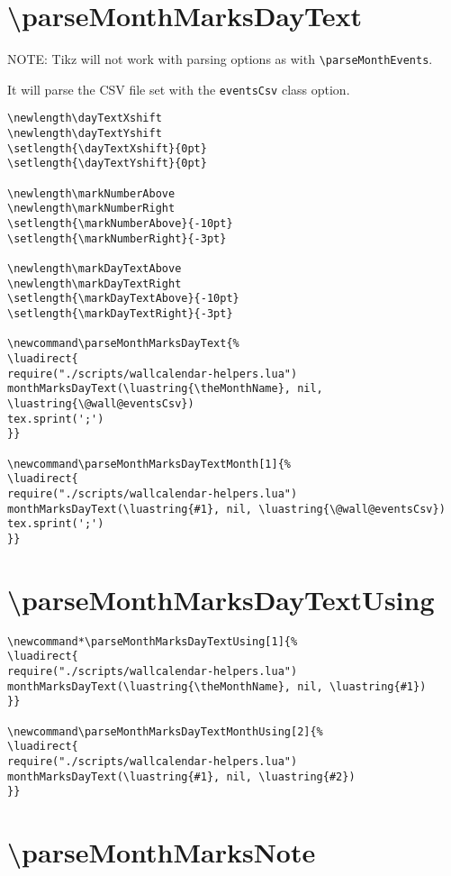 \documentclass[11pt,oneside]{memoir-article}
\begin{document}
\section{\textbackslash parseMonthMarksDayText}
\label{sec-9-10}

NOTE: Tikz will not work with parsing options as with \texttt{\textbackslash{}parseMonthEvents}.

It will parse the CSV file set with the \texttt{eventsCsv} class option.

\begin{verbatim}
\newlength\dayTextXshift
\newlength\dayTextYshift
\setlength{\dayTextXshift}{0pt}
\setlength{\dayTextYshift}{0pt}

\newlength\markNumberAbove
\newlength\markNumberRight
\setlength{\markNumberAbove}{-10pt}
\setlength{\markNumberRight}{-3pt}

\newlength\markDayTextAbove
\newlength\markDayTextRight
\setlength{\markDayTextAbove}{-10pt}
\setlength{\markDayTextRight}{-3pt}

\newcommand\parseMonthMarksDayText{%
\luadirect{
require("./scripts/wallcalendar-helpers.lua")
monthMarksDayText(\luastring{\theMonthName}, nil, \luastring{\@wall@eventsCsv})
tex.sprint(';')
}}

\newcommand\parseMonthMarksDayTextMonth[1]{%
\luadirect{
require("./scripts/wallcalendar-helpers.lua")
monthMarksDayText(\luastring{#1}, nil, \luastring{\@wall@eventsCsv})
tex.sprint(';')
}}
\end{verbatim}

\section{\textbackslash parseMonthMarksDayTextUsing}
\label{sec-9-11}

\begin{verbatim}
\newcommand*\parseMonthMarksDayTextUsing[1]{%
\luadirect{
require("./scripts/wallcalendar-helpers.lua")
monthMarksDayText(\luastring{\theMonthName}, nil, \luastring{#1})
}}

\newcommand\parseMonthMarksDayTextMonthUsing[2]{%
\luadirect{
require("./scripts/wallcalendar-helpers.lua")
monthMarksDayText(\luastring{#1}, nil, \luastring{#2})
}}
\end{verbatim}

\section{\textbackslash parseMonthMarksNote}
\label{sec-9-12}
\end{document}
